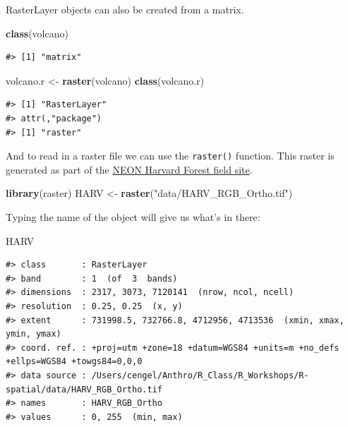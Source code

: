 \documentclass[]{book}
\newenvironment{Shaded}{\begin{snugshade}}{\end{snugshade}}
\newcommand{\KeywordTok}[1]{\textcolor[rgb]{0.13,0.29,0.53}{\textbf{#1}}}
\newcommand{\StringTok}[1]{\textcolor[rgb]{0.31,0.60,0.02}{#1}}
\newcommand{\NormalTok}[1]{#1}
\theoremstyle{definition}
\theoremstyle{definition}
\theoremstyle{definition}
\theoremstyle{remark}
\begin{document}
RasterLayer objects can also be created from a matrix.

\begin{Shaded}
\begin{Highlighting}[]
\KeywordTok{class}\NormalTok{(volcano)}
\end{Highlighting}
\end{Shaded}

\begin{verbatim}
#> [1] "matrix"
\end{verbatim}

\begin{Shaded}
\begin{Highlighting}[]
\NormalTok{volcano.r <-}\StringTok{ }\KeywordTok{raster}\NormalTok{(volcano)}
\KeywordTok{class}\NormalTok{(volcano.r)}
\end{Highlighting}
\end{Shaded}

\begin{verbatim}
#> [1] "RasterLayer"
#> attr(,"package")
#> [1] "raster"
\end{verbatim}

And to read in a raster file we can use the \texttt{raster()} function.
This raster is generated as part of the
\href{https://www.neonscience.org/field-sites/field-sites-map/HARV}{NEON
Harvard Forest field site}.

\begin{Shaded}
\begin{Highlighting}[]
\KeywordTok{library}\NormalTok{(raster)}
\NormalTok{HARV <-}\StringTok{ }\KeywordTok{raster}\NormalTok{(}\StringTok{"data/HARV_RGB_Ortho.tif"}\NormalTok{)}
\end{Highlighting}
\end{Shaded}

Typing the name of the object will give us what's in there:

\begin{Shaded}
\begin{Highlighting}[]
\NormalTok{HARV}
\end{Highlighting}
\end{Shaded}

\begin{verbatim}
#> class       : RasterLayer 
#> band        : 1  (of  3  bands)
#> dimensions  : 2317, 3073, 7120141  (nrow, ncol, ncell)
#> resolution  : 0.25, 0.25  (x, y)
#> extent      : 731998.5, 732766.8, 4712956, 4713536  (xmin, xmax, ymin, ymax)
#> coord. ref. : +proj=utm +zone=18 +datum=WGS84 +units=m +no_defs +ellps=WGS84 +towgs84=0,0,0 
#> data source : /Users/cengel/Anthro/R_Class/R_Workshops/R-spatial/data/HARV_RGB_Ortho.tif 
#> names       : HARV_RGB_Ortho 
#> values      : 0, 255  (min, max)
\end{verbatim}
\end{document}
